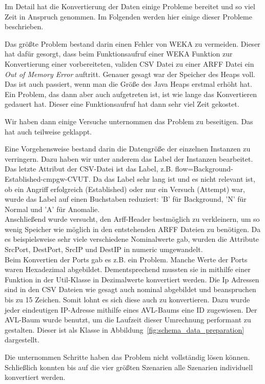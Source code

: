 \documentclass[main.tex]{subfiles}
\begin{document}
Im Detail hat die Konvertierung der Daten einige Probleme bereitet und so viel
Zeit in Anspruch genommen.
Im Folgenden werden hier einige dieser Probleme beschrieben.

Das größte Problem bestand darin einen Fehler von WEKA zu vermeiden. Dieser hat
dafür gesorgt, dass beim Funktionsaufruf einer WEKA Funktion zur Konvertierung
einer vorbereiteten, validen CSV Datei zu einer ARFF Datei ein \textit{Out of Memory Error} auftritt.
Genauer gesagt war der Speicher des Heaps voll. Das ist auch passiert, wenn man
die Größe des Java Heaps erstmal erhöht hat. Ein Problem, das dann aber auch
aufgetreten ist, ist wie lange das Konvertieren gedauert hat.
Dieser eine Funktionsaufruf hat dann sehr viel Zeit gekostet.

Wir haben dann einige Versuche unternommen das Problem zu beseitigen.
Das hat auch teilweise geklappt.

Eine Vorgehensweise bestand darin die Datengröße der einzelnen Instanzen zu
verringern.
Dazu haben wir unter anderem das Label der Instanzen bearbeitet.
Das letzte Attribut der CSV-Datei ist das Label, z.B. flow=Background-Established-cmpgw-CVUT.
Da das Label sehr lang ist und es nicht relevant ist, ob ein Angriff erfolgreich (Established) oder nur ein Versuch (Attempt) war, wurde das Label auf einen Buchstaben reduziert: 'B' für Background, 'N' für Normal und 'A' für Anomalie.\\

Anschließend wurde versucht, den Arff-Header bestmöglich zu verkleinern, um so
wenig Speicher wie möglich in den entstehenden ARFF Dateien zu benötigen.
Da es beispielsweise sehr viele verschiedene Nominalwerte gab, wurden die Attribute SrcPort, DestPort, SrcIP und DestIP in numeric umgewandelt. \\
Beim Konvertien der Ports gab es z.B. ein Problem.
Manche Werte der Ports waren Hexadezimal abgebildet. Dementsprechend mussten sie in mithilfe einer Funktion in der Util-Klasse in Dezimalwerte konvertiert werden.
Die Ip Adressen sind in den CSV Dateien wie gesagt auch nominal abgebildet und
beanspruchen bis zu 15 Zeichen.
Somit lohnt es sich diese auch zu konvertieren.
Dazu wurde jeder eindeutigen IP-Adresse mithilfe eines AVL-Baums eine ID zugewiesen.
Der AVL-Baum wurde benutzt, um die Laufzeit dieser Umrechnung performant zu
gestalten.
Dieser ist als Klasse in Abbildung~\ref{fig:schema_data_preparation}
dargestellt.

Die unternommen Schritte haben das Problem nicht vollständig lösen können.
Schließlich konnten bis auf die vier größten Szenarien alle Szenarien individuell konvertiert werden.
\end{document}

